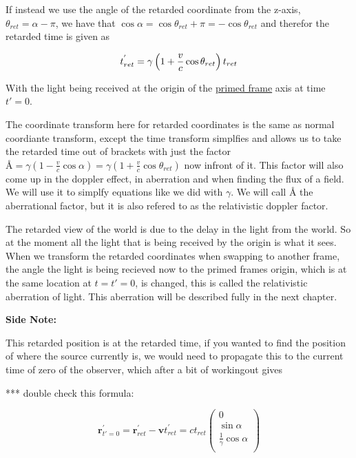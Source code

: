 If instead we use the angle of the retarded coordinate from the z-axis, $\theta_{ret} = \alpha - \pi$, we have that $\cos{\alpha}=\cos{\theta_{ret}+\pi}=-\cos{\theta_{ret}}$ and therefor the retarded time is given as

\begin{equation}
	\\ {{t}_{ret}^{'}} = {\gamma} \left(1 + \frac{v}{c} \cos{\theta_{ret}} \right) {{{t}_{ret}}}
\end{equation}

With the light being received at the origin of the \hyperlink{def-Primed-Frame}{primed frame} axis at time ${t{'}} = 0$.

The coordinate transform here for retarded coordinates is the same as normal coordiante transform, except the time transform simplfies and allows us to take the retarded time out of brackets with just the factor $\text{\AA}={\gamma} \left(1-\frac{v}{c} \cos{\alpha} \right) = {\gamma} \left(1 + \frac{v}{c} \cos{\theta_{ret}} \right)$ now infront of it.
This factor will also come up in the doppler effect, in aberration and when finding the flux of a field.
We will use it to simplfy equations like we did with $\gamma$.
We will call $\text{\AA}$ the aberrational factor, but it is also refered to as the relativistic doppler factor.

The retarded view of the world is due to the delay in the light from the world.
So at the moment all the light that is being received by the origin is what it sees.
When we transform the retarded coordinates when swapping to another frame, the angle the light is being recieved now to the primed frames origin, which is at the same location at ${t}={t{'}}=0$, is changed, this is called the relativistic aberration of light.
This aberration will be described fully in the next chapter.

\textbf{Side Note:}

This retarded position is at the retarded time, if you wanted to find the position of where the source currently is, we would need to propagate this to the current time of zero of the observer, which after a bit of workingout gives

*** double check this formula:

\begin{equation}
	\label{eq: primed position with synced times}
	\mathbf{r}_{{t{'}} = 0}^{'} = \mathbf{r}_{ret}^{'}-\mathbf{v}t_{ret}^{'} = {c}{{t}_{ret}}
	\begin{pmatrix}
		0                               \\
		\sin{\alpha}                    \\
		\frac{1}{{\gamma}} \cos{\alpha} \\
	\end{pmatrix}
\end{equation}


